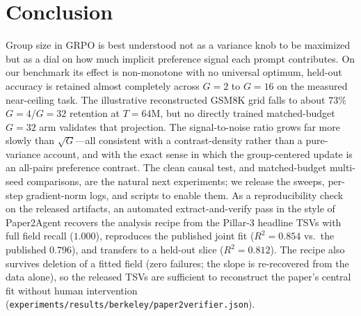 \documentclass{article}
\begin{document}
\section{Conclusion}
\label{sec:p3-conclusion}
Group size in GRPO is best understood not as a variance knob to be maximized but as
a dial on how much implicit preference signal each prompt contributes. On our
benchmark its effect is non-monotone with no universal optimum, held-out
accuracy is retained almost completely across $G{=}2$ to $G{=}16$ on the
measured near-ceiling task. The illustrative reconstructed GSM8K grid falls to
about $73\%$ $G{=}4$/$G{=}32$ retention at $T{=}64$M, but no directly trained
matched-budget $G{=}32$ arm validates that projection. The signal-to-noise ratio grows
far more slowly than $\sqrt{G}$---all consistent with a contrast-density rather than
a pure-variance account, and with the exact sense in which the group-centered update
is an all-pairs preference contrast. The clean causal test, and matched-budget
multi-seed comparisons, are the natural next experiments; we release the sweeps,
per-step gradient-norm logs, and scripts to enable them. As a reproducibility
check on the released artifacts, an automated extract-and-verify pass in the
style of Paper2Agent \citep{miao2025paper2agent} recovers the analysis recipe
from the Pillar-3 headline TSVs with full field recall ($1.000$), reproduces
the published joint fit ($R^2{=}0.854$ vs.\ the published $0.796$), and
transfers to a held-out slice ($R^2{=}0.812$). The recipe also survives
deletion of a fitted field (zero failures; the slope is re-recovered from the
data alone), so the released TSVs are sufficient to reconstruct the paper's
central fit without human intervention
(\texttt{experiments/results/berkeley/paper2verifier.json}).
 

\end{document}
